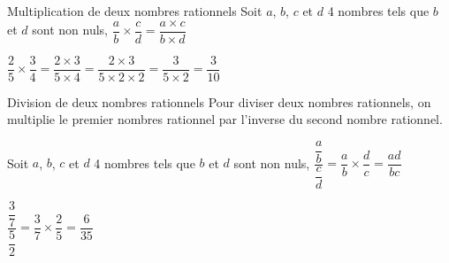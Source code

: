 \begin{pageCours}
\begin{minipage}[t]{0.5\linewidth}
\begin{DefT}{Multiplication de deux nombres rationnels}
Soit $a$, $b$, $c$ et $d$ 4 nombres tels que $b$ et $d$ sont non nuls, $\dfrac{a}{b}\times \dfrac{c}{d} = \dfrac{a\times c}{b\times d}$
\end{DefT}

\begin{Ex}
 $\dfrac{2}{5}\times \dfrac{3}{4} = \dfrac{2 \times 3 }{5 \times 4}  = \dfrac{2 \times 3 }{5 \times 2 \times 2}= \dfrac{3}{5 \times 2}= \dfrac{3}{10}$ 
\end{Ex}
\end{minipage}


\begin{minipage}[t]{0.6\linewidth}
\begin{DefT}{Division de deux nombres rationnels}
Pour diviser deux nombres rationnels, on multiplie le premier nombres rationnel par l'inverse du second nombre rationnel.

Soit $a$, $b$, $c$ et $d$ 4 nombres tels que $b$ et $d$ sont non nuls, $\dfrac{\dfrac{a}{b}}{ \dfrac{c}{d}} = \dfrac{a}{b}\times \dfrac{d}{c}=\dfrac{ad}{bc}$
\end{DefT}
\end{minipage}
\begin{minipage}[t]{0.4\linewidth}
\begin{Ex}
 $\dfrac{\dfrac{3}{7}}{\dfrac{5}{2}} =\dfrac{3}{7} \times \dfrac{2}{5}=\dfrac{6}{35}$ 
\end{Ex}
\end{minipage}


\end{pageCours} %


